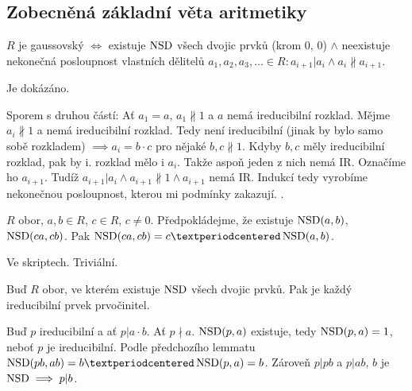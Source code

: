 \documentclass[12pt]{article}                   %
\begin{document}
    \subsection{Zobecněná základní věta aritmetiky}
        \begin{veta}
            $R$ je gaussovský $\Leftrightarrow$ existuje $\operatorname{NSD}$ všech dvojic prvků (krom 0, 0) $\land$ neexistuje nekonečná posloupnost vlastních dělitelů $a_1, a_2, a_3, … \in R: a_{i+1}|a_i \land a_i \nparallel a_{i+1}$.

            \begin{dukazin}[$\implies$]
                Je dokázáno.
            \end{dukazin}

            \begin{dukazin}
                Sporem s druhou částí: Ať $a_1 = a$, $a_1 \nparallel1$ a $a$ nemá ireducibilní rozklad. Mějme $a_i \nparallel 1$ a nemá ireducibilní rozklad. Tedy není ireducibilní (jinak by bylo samo sobě rozkladem) $\implies a_i = b·c$ pro nějaké $b, c \nparallel1$. Kdyby $b, c$ měly ireducibilní rozklad, pak by i. rozklad mělo i $a_i$. Takže aspoň jeden z nich nemá IR. Označíme ho $a_{i+1}$. Tudíž $a_{i+1}|a_i \land a_{i+1}\nparallel1 \land a_{i+1}$ nemá IR. Indukcí tedy vyrobíme nekonečnou posloupnost, kterou mi podmínky zakazují. \lightning.
            \end{dukazin}

            \begin{lemmain}
                $R$ obor, $a, b \in R$, $c \in R$, $c ≠ 0$. Předpokládejme, že existuje $\operatorname{NSD}(a, b)$, $\operatorname{NSD}(ca, cb)$. Pak $\NSD(ca, cb) = c·\NSD(a, b)$.

                \begin{dukazin}
                    Ve skriptech. Triviální.
                \end{dukazin}
            \end{lemmain}

            \begin{lemmain}
                Buď $R$ obor, ve kterém existuje $\operatorname{NSD}$ všech dvojic prvků. Pak je každý ireducibilní prvek prvočinitel.

                \begin{dukazin}
                    Buď $p$ ireducibilní a ať $p|a·b$. Ať $p \nmid a$. $\operatorname{NSD}(p, a)$ existuje, tedy $\operatorname{NSD}(p, a) = 1$, neboť $p$ je ireducibilní. Podle předchozího lemmatu $\NSD(pb, ab) = b·\NSD(p, a) = b$. Zároveň $p | pb$ a $p|ab$, $b$ je $\operatorname{NSD} \implies p|b$.
                \end{dukazin}
            \end{lemmain}


\end{veta}
\end{document}
